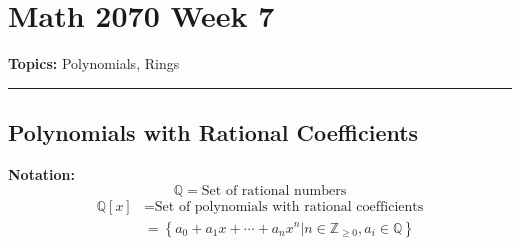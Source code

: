 \documentclass[a4paper,12pt]{report}
\newcounter{statement}
\numberwithin{statement}{chapter}
\numberwithin{equation}{chapter}
\numberwithin{section}{chapter}
\numberwithin{subsection}{section}
\begin{document}
\setcounter{chapter}{7}\setcounter{section}{0}
\setcounter{subsection}{0}
\setcounter{statement}{0}

\chapter*{Math 2070 Week 7}
{\bf Topics: }Polynomials, Rings
\hrule




\section{Polynomials with Rational Coefficients}

 {\bf Notation:} 
\[
\mathbb{Q} = \text{Set of rational numbers}
\]
\[
\begin{split}
\mathbb{Q}[x] &= \text{Set of polynomials with rational coefficients}\\
&= \left\{a_0 + a_1 x + \cdots + a_n x^n | n \in \mathbb{Z}_{\geq 0}, a_i \in \mathbb{Q}\right\}
\end{split}
\]
\end{document}
